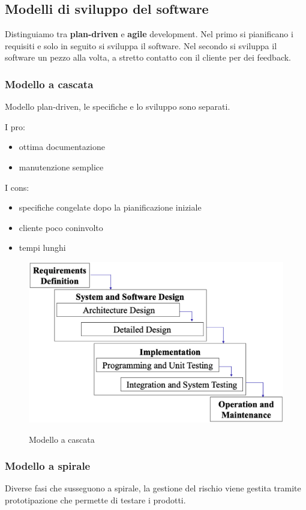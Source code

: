 \documentclass{article}
\begin{document}
\subsection{Modelli di sviluppo del software}
Distinguiamo tra \textbf{plan-driven} e \textbf{agile} development. Nel primo si pianificano 
i requisiti e solo in seguito si sviluppa il software. Nel secondo si sviluppa il software un pezzo alla
volta, a stretto contatto con il cliente per dei feedback.

\subsubsection{Modello a cascata}
Modello plan-driven, le specifiche e lo sviluppo sono separati.

I pro:
\begin{itemize}
    \item ottima documentazione
    \item manutenzione semplice
\end{itemize}

I cons:
\begin{itemize}
    \item specifiche congelate dopo la pianificazione iniziale
    \item cliente poco coninvolto
    \item tempi lunghi
\end{itemize}

\begin{figure}[h!]
    \centering
    \includegraphics[width=0.5\linewidth]{imgs/1 - cascata.png}
    \label{fig:modello_cascata}
    \caption{Modello a cascata}
\end{figure}

\subsubsection{Modello a spirale}
Diverse fasi che susseguono a spirale, la gestione del rischio viene gestita
tramite prototipazione che permette di testare i prodotti.
\end{document}
